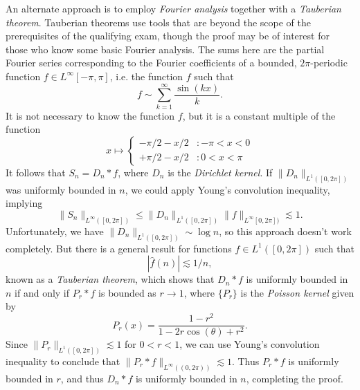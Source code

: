 \documentclass[answers]{exam}
\begin{document}
\begin{questions}
\begin{solution}
An alternate approach is to employ \emph{Fourier analysis} together with a \emph{Tauberian theorem}. Tauberian theorems use tools that  are beyond the scope of the prerequisites of the qualifying exam, though the proof may be of interest for those who know some basic Fourier analysis. The sums here are the partial Fourier series corresponding to the Fourier coefficients of a bounded, $2 \pi$-periodic function $f \in L^\infty[-\pi,\pi]$, i.e. the function $f$ such that
%
\[ f \sim \sum_{k = 1}^\infty \frac{\sin(kx)}{k}. \]
%
It is not necessary to know the function $f$, but it is a constant multiple of the function
%
\[ x \mapsto \begin{cases} -\pi/2 - x/2 &: -\pi < x < 0 \\ +\pi/2 - x/2 &: 0 < x < \pi \end{cases} \]
%
It follows that $S_n = D_n * f$, where $D_n$ is the \emph{Dirichlet kernel}. If $\| D_n \|_{L^1([0,2\pi])}$ was uniformly bounded in $n$, we could apply Young's convolution inequality, implying
%
\[ \| S_n \|_{L^\infty([0,2\pi])} \leq \| D_n \|_{L^1([0,2\pi])} \| f \|_{L^\infty[0,2\pi])} \lesssim 1. \]
%
Unfortunately, we have $\| D_n \|_{L^1([0,2\pi])} \sim \log n$, so this approach doesn't work completely. But there is a general result for functions $f \in L^1([0,2\pi])$ such that
%
\[ |\widehat{f}(n)| \lesssim 1/n, \]
%
known as a \emph{Tauberian theorem}, which shows that $D_n * f$ is uniformly bounded in $n$ if and only if $P_r * f$ is bounded as $r \to 1$, where $\{ P_r \}$ is the \emph{Poisson kernel} given by
%
\[ P_r(x) = \frac{1 - r^2}{1 - 2 r \cos(\theta) + r^2}. \]
%
Since $\| P_r \|_{L^1([0,2\pi])} \lesssim 1$ for $0 < r < 1$, we can use Young's convolution inequality to conclude that $\| P_r * f \|_{L^\infty((0,2\pi))} \lesssim 1$. Thus $P_r * f$ is uniformly bounded in $r$, and thus $D_n * f$ is uniformly bounded in $n$, completing the proof.

\end{solution}


\end{questions}
\end{document}

